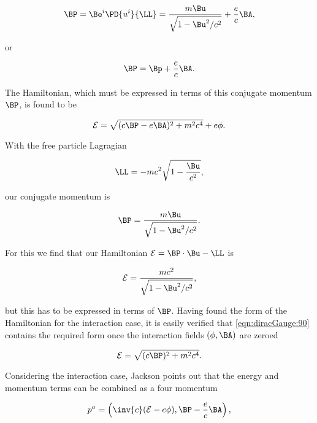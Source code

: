 \begin{equation}\label{eqn:diracGauge:50}
\BP = \Be^i \PD{u^i}{\LL} = \frac{m \Bu}{\sqrt{1 - \Bu^2/c^2}} + \frac{e}{c} \BA,
\end{equation}

or

\begin{equation}\label{eqn:diracGauge:70}
\BP = \Bp + \frac{e}{c} \BA.
\end{equation}

The Hamiltonian, which must be expressed in terms of this conjugate momentum $\BP$, is found to be

\begin{equation}\label{eqn:diracGauge:90}
\mathcal{E} = \sqrt{ (c \BP - e \BA)^2 + m^2 c^4 } + e \phi.
\end{equation}

With the free particle Lagragian

\begin{equation}\label{eqn:diracGauge:110}
\LL = -m c^2 \sqrt{ 1 - \frac{\Bu}{c^2}} ,
\end{equation}

our conjugate momentum is

\begin{equation}\label{eqn:diracGauge:130}
\BP = \frac{m \Bu}{\sqrt{ 1 - \Bu^2/c^2} }.
\end{equation}

For this we find that our Hamiltonian $\mathcal{E} = \BP \cdot \Bu - \LL$ is

\begin{equation}\label{eqn:diracGauge:150}
\mathcal{E} = \frac{m c^2}{\sqrt{1 - \Bu^2/c^2}},
\end{equation}

but this has to be expressed in terms of $\BP$.  Having found the form of the Hamiltonian for the interaction case, it is easily verified that \ref{eqn:diracGauge:90} contains the required form once the interaction fields $(\phi, \BA)$ are zeroed

\begin{equation}\label{eqn:diracGauge:90b}
\mathcal{E} = \sqrt{ (c \BP)^2 + m^2 c^4 }.
\end{equation}

Considering the interaction case, Jackson points out that the energy and momentum terms can be combined as a four momentum

\begin{equation}\label{eqn:diracGauge:170}
p^a = \left( \inv{c}(\mathcal{E} - e \phi), \BP - \frac{e}{c}\BA \right),
\end{equation}

